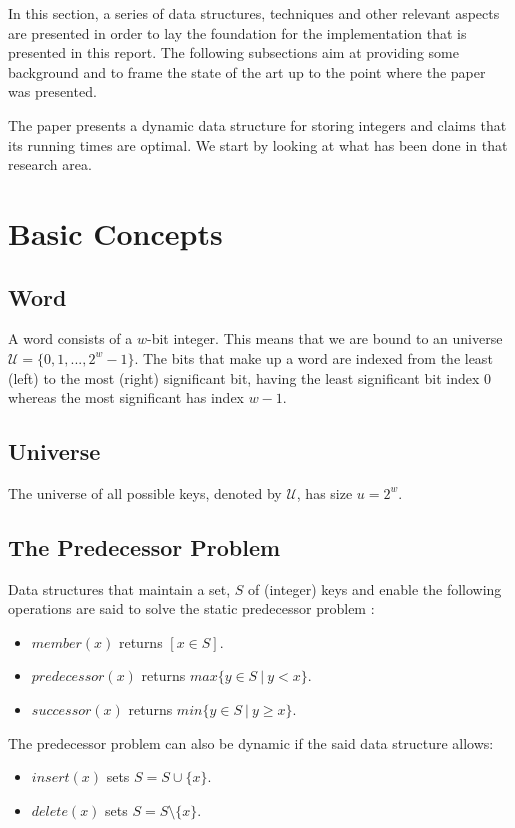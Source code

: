 In this section, a series of data structures, techniques and other relevant aspects are presented in order to lay the foundation for the implementation that is presented in this report. The following subsections aim at providing some background and to frame the state of the art up to the point where the  \cite{patrascu2014dynamic} paper was presented.

The \cite{patrascu2014dynamic} paper presents a dynamic data structure for storing integers and claims that its running times are optimal. We start by looking at what has been done in that research area.

\section{Basic Concepts}

\subsection{Word}
A word consists of a $w$-bit integer. This means that we are bound to an universe $\mathcal U = \{0, 1, ..., 2^{w}-1\}$. The bits that make up a word are indexed from the least (left) to the most (right) significant bit, having the least significant bit index $0$ whereas the most significant has index $w-1$.

\subsection{Universe}
The universe of all possible keys, denoted by $\mathcal U$, has size $u = 2^{w}$. 

\subsection{The Predecessor Problem}
Data structures that maintain a set, $S$ of (integer) keys and enable the following operations are said to solve the static predecessor problem \cite{beame1999optimal}:
\begin{itemize}
    \item
    $member(x)$ returns $[x \in S]$.
    \item
    $predecessor(x)$ returns $max\{y\in S\ |\ y < x\}$.
    \item
    $successor(x)$ returns $min\{y\in S\ |\ y \geq x\}$.
\end{itemize}

The predecessor problem can also be dynamic \cite{beame1999optimal} if the said data structure allows:
\begin{itemize}
    \item
    $insert(x)$ sets $S=S \cup \{x\}$.
    \item
    $delete(x)$ sets $S=S \setminus \{x\}$.
\end{itemize}

